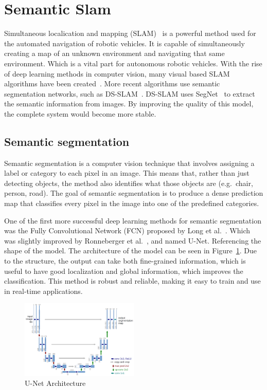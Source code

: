 \section{Semantic Slam}
Simultaneous localication and mapping (SLAM)~\cite{chatila1985position} is a powerful method used for the automated navigation of robotic vehicles. It is capable of simultaneously creating a map of an unknown environment and navigating that same environment. Which is a vital part for autonomous robotic vehicles. With the rise of deep learning methods in computer vision, many visual based SLAM algorithms have been created~\cite{taketomi2017visual}. More recent algorithms use semantic segmentation networks, such as DS-SLAM~\cite{yu2018ds}. DS-SLAM uses SegNet~\cite{badri2017segnet} to extract the semantic information from images. By improving the quality of this model, the complete system would become more stable.

\subsection{Semantic segmentation}
Semantic segmentation is a computer vision technique that involves assigning a label or category to each pixel in an image. This means that, rather than just detecting objects, the method also identifies what those objects are (e.g.\, chair, person, road). The goal of semantic segmentation is to produce a dense prediction map that classifies every pixel in the image into one of the predefined categories.

One of the first more successful deep learning methods for semantic segmentation was the Fully Convolutional Network (FCN) proposed by Long et al.~\cite{long2015fully}. Which was slightly improved by Ronneberger et al.~\cite{ronneberger2015u}, and named U-Net. Referencing the shape of the model. The architecture of the model can be seen in Figure~\ref{fig:unet-architecture}. Due to the structure, the output can take both fine-grained information, which is useful to have good localization and global information, which improves the classification. This method is robust and reliable, making it easy to train and use in real-time applications.
\begin{figure}[ht]
    \centering
    \includegraphics[width=0.5\textwidth]{figures/unet-architecture.png}
    \caption{U-Net Architecture~\cite{ronneberger2015u}}
    \label{fig:unet-architecture}
\end{figure}

